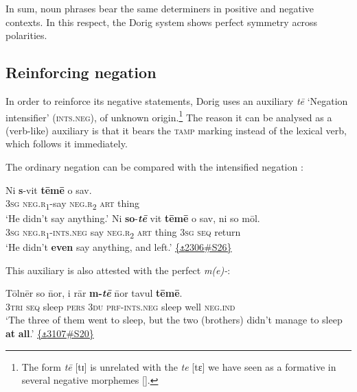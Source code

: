 \documentclass[output=paper,colorlinks,citecolor=brown,draft]{langscibook}
\begin{document}
In sum, noun phrases bear the same determiners in positive and negative contexts. In this respect, the Dorig system shows perfect symmetry across polarities.%

\subsection{Reinforcing negation}\label{sec:dor:4.4}

In order to reinforce its negative statements, Dorig uses an auxiliary \textit{tē} ‘Negation intensifier’ (\textsc{ints.neg}), of unknown origin.\footnote{The form \textit{tē} [tɪ] is unrelated with the \textit{te} [tɛ] we have seen as a formative in several negative morphemes [].} The reason it can be analysed as a (verb-like) auxiliary is that it bears the \textsc{tamp} marking instead of the lexical verb, which follows it immediately.

The ordinary negation  can be compared with the intensified negation :

\ea\label{ex:dor:intens}
    \ea\label{ex:dor:intens1}
        \gll  Ni \textbf{s}-vit \textbf{tēmē} o sav.\\ 
             \textsc{3sg} \textsc{neg.r}\textsubscript{1}-say \textsc{neg.r}\textsubscript{2} \textsc{art} thing\\
        \glt ‘He didn’t say anything.’
    \ex\label{ex:dor:intens2}
        \gll  Ni \textbf{so}-\textbf{\textit{tē}} vit \textbf{tēmē} o sav, ni so mōl.\\
              \textsc{3sg} \textsc{neg.r}\textsubscript{1}-\textsc{ints.neg} say \textsc{neg.r}\textsubscript{2} \textsc{art} thing \textsc{3sg} \textsc{seq} return\\
        \glt ‘He didn’t \textbf{even} say anything, and left.’ \quad \href{https://doi.org/10.24397/pangloss-0002306#S26}{\{\texttt{⚓}2306\#S26\}}
    \z
\z 


This auxiliary is also attested with the perfect \textit{m(e)-}: 

\ea\label{ex:dor:sleep} 
    \gll  Tōlnēr so \={n}or, i rār \textbf{m-\textit{tē}} \={n}or tavul \textbf{tēmē}.\\ 
          \textsc{3tri} \textsc{seq} sleep \textsc{pers} \textsc{3du} \textsc{prf}-\textsc{ints.neg} sleep well \textsc{neg.ind}\\
    \glt ‘The three of them went to sleep, but the two (brothers) didn’t manage to sleep \textbf{at} \textbf{all}.’ \quad  \href{https://doi.org/10.24397/pangloss-0003107#S20}{\{\texttt{⚓}3107\#S20\}}
\z 
\end{document}
